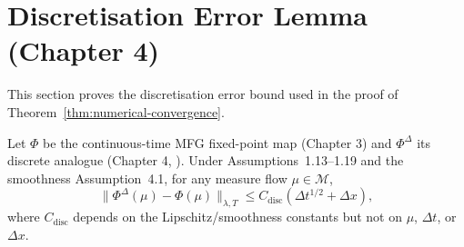 \section{Discretisation Error Lemma (Chapter 4)}
\label{sec:appA-discretisation}

This section proves the discretisation error bound used in the proof of
Theorem~\ref{thm:numerical-convergence}.

\begin{lemma}
\label{lem:appA-discretisation-error}
Let $\Phi$ be the continuous-time MFG fixed-point map (Chapter 3) and
$\Phi^\Delta$ its discrete analogue (Chapter 4, ).
Under Assumptions~1.13--1.19 and the smoothness Assumption~4.1, for any measure
flow $\mu \in \mathcal{M}$,
\[
    \|\Phi^\Delta(\mu) - \Phi(\mu)\|_{\lambda,T} \leq C_{\mathrm{disc}}(\Delta
    t^{1/2} + \Delta x),
\]
where $C_{\mathrm{disc}}$ depends on the Lipschitz/smoothness constants but not on
$\mu$, $\Delta t$, or $\Delta x$.
\end{lemma}

